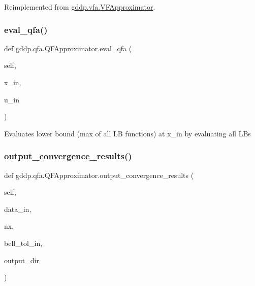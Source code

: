 Reimplemented from \mbox{\hyperlink{classgddp_1_1vfa_1_1_v_f_approximator_a612636b5857332f4798eab6dade1f729}{gddp.\+vfa.\+V\+F\+Approximator}}.

\mbox{\label{classgddp_1_1qfa_1_1_q_f_approximator_a2f3076300b243bc8a38d3fb38c74b8d2}} 
\subsubsection{\texorpdfstring{eval\_qfa()}{eval\_qfa()}}
{\footnotesize\ttfamily def gddp.\+qfa.\+Q\+F\+Approximator.\+eval\+\_\+qfa (\begin{DoxyParamCaption}\item[{}]{self,  }\item[{}]{x\+\_\+in,  }\item[{}]{u\+\_\+in }\end{DoxyParamCaption})}

\begin{DoxyVerb}Evaluates lower bound (max of all LB functions) at x_in by evaluating all LBs\end{DoxyVerb}
 \mbox{\label{classgddp_1_1qfa_1_1_q_f_approximator_a9d399c0b2d3a45f5274805575945e183}} 
\subsubsection{\texorpdfstring{output\_convergence\_results()}{output\_convergence\_results()}}
{\footnotesize\ttfamily def gddp.\+qfa.\+Q\+F\+Approximator.\+output\+\_\+convergence\+\_\+results (\begin{DoxyParamCaption}\item[{}]{self,  }\item[{}]{data\+\_\+in,  }\item[{}]{nx,  }\item[{}]{bell\+\_\+tol\+\_\+in,  }\item[{}]{output\+\_\+dir }\end{DoxyParamCaption})}

